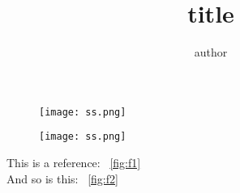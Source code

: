 \documentclass[]{amsart}
\begin{document}
\title{title}
\author{author}


\maketitle



\begin{figure}[] 
 \centering 
 \texttt{[image: ss.png]} 
 
 \caption{} 
 \end{figure}  \label{fig:f1} 
\begin{figure}[] 
 \centering 
 \texttt{[image: ss.png]} 
 
 \caption{} 
 \end{figure}  \label{fig:f2} 
This is a reference:  ~\ref{fig:f1} 
 \\
And so is this:  ~\ref{fig:f2} 
 \\
\end{document}
